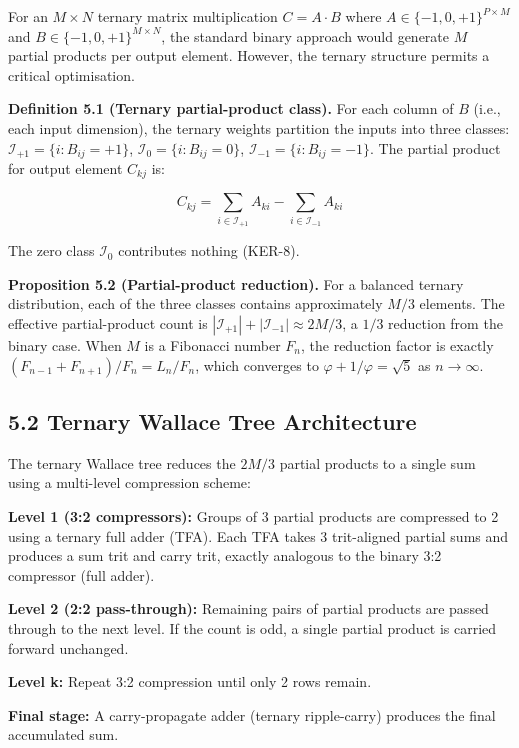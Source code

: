 For an \(M \times N\) ternary matrix multiplication \(C = A \cdot B\)
where \(A \in \{-1,0,+1\}^{P \times M}\) and
\(B \in \{-1,0,+1\}^{M \times N}\), the standard binary approach would
generate \(M\) partial products per output element. However, the ternary
structure permits a critical optimisation.

\textbf{Definition 5.1 (Ternary partial-product class).} For each
column of \(B\) (i.e., each input dimension), the ternary weights
partition the inputs into three classes:
\(\mathcal{I}_{+1} = \{i : B_{ij} = +1\}\),
\(\mathcal{I}_0 = \{i : B_{ij} = 0\}\),
\(\mathcal{I}_{-1} = \{i : B_{ij} = -1\}\).
The partial product for output element \(C_{kj}\) is:

\[
C_{kj} = \sum_{i \in \mathcal{I}_{+1}} A_{ki} - \sum_{i \in \mathcal{I}_{-1}} A_{ki}
\]

The zero class \(\mathcal{I}_0\) contributes nothing (KER-8).

\textbf{Proposition 5.2 (Partial-product reduction).} For a balanced
ternary distribution, each of the three classes contains approximately
\(M/3\) elements. The effective partial-product count is
\(|\mathcal{I}_{+1}| + |\mathcal{I}_{-1}| \approx 2M/3\), a
\(1/3\) reduction from the binary case. When \(M\) is a Fibonacci
number \(F_n\), the reduction factor is exactly
\((F_{n-1} + F_{n+1})/F_n = L_n/F_n\), which converges to
\(\varphi + 1/\varphi = \sqrt{5}\) as \(n \to \infty\).

\subsection{5.2 Ternary Wallace Tree Architecture}

The ternary Wallace tree reduces the \(2M/3\) partial products to a
single sum using a multi-level compression scheme:

\textbf{Level 1 (3:2 compressors):} Groups of 3 partial products are
compressed to 2 using a ternary full adder (TFA). Each TFA takes 3
trit-aligned partial sums and produces a sum trit and carry trit,
exactly analogous to the binary 3:2 compressor (full adder).

\textbf{Level 2 (2:2 pass-through):} Remaining pairs of partial
products are passed through to the next level. If the count is odd,
a single partial product is carried forward unchanged.

\textbf{Level k:} Repeat 3:2 compression until only 2 rows remain.

\textbf{Final stage:} A carry-propagate adder (ternary ripple-carry)
produces the final accumulated sum.

